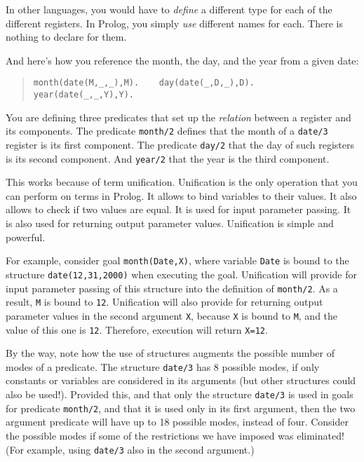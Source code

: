 In other languages, you would have to {\em define} a different type
for each of the different registers. In Prolog, you simply {\em use}
different names for each. There is nothing to declare for them.

And here's how you reference the month, the day, and the year from a
given date:
\begin{quote}
\begin{verbatim}
month(date(M,_,_),M).    day(date(_,D,_),D).      year(date(_,_,Y),Y).
\end{verbatim}
\end{quote}
%
You are defining three predicates that set up the {\em relation}
between a register and its components. The predicate \verb+month/2+
defines that the month of a \verb+date/3+ register is its first
component. The predicate \verb+day/2+ that the day of such registers
is its second component. And \verb+year/2+ that the year is the third
component.

This works because of term unification. Unification is the only
operation that you can perform on terms in Prolog. It allows to bind
variables to their values. It also allows to check if two values are
equal. It is used for input parameter passing. It is also used for
returning output parameter values. Unification is simple and powerful.

For example, consider goal \verb+month(Date,X)+, where variable
\verb+Date+ is bound to the structure \verb+date(12,31,2000)+ when
executing the goal. Unification will 
provide for input parameter passing of this structure into the
definition of \verb+month/2+. As a result, \verb+M+ is bound to
\verb+12+. Unification will also provide for returning output
parameter values in the second argument \verb+X+, because \verb+X+ is
bound to \verb+M+, and the value of this one is \verb+12+. Therefore,
execution will return \verb+X=12+.

By the way, note how the use of structures augments the possible
number of modes of a predicate. The structure \verb+date/3+ has 8
possible modes, if only constants or variables are considered in its
arguments (but other structures could also be used!). Provided this, 
and that only the structure \verb+date/3+ is used in goals for
predicate \verb+month/2+, and that it is used only in its first
argument, then the two argument predicate will have up to 18 possible
modes, instead of four. Consider the possible modes if some of the
restrictions we have imposed was eliminated! (For example, using 
\verb+date/3+ also in the second argument.)

